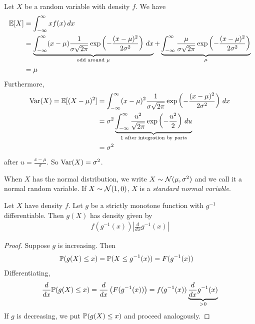 \documentclass{../template/note}
\begin{document}
    Let \(X\) be a random variable with density \(f\). We have
    \begin{align*}
        \mathbb E[X] &= \int_{-\infty}^\infty xf(x) \,d{x} \\
        &= \underbrace{\int_{-\infty}^\infty (x-\mu)\frac{1}{\sigma \sqrt{2\pi}} \exp\left(-\frac{(x-\mu)^2}{2\sigma^2}\right) \,d{x}}_{\text{odd around } \mu} + \underbrace{\int_{-\infty}^\infty \frac{\mu}{\sigma \sqrt{2\pi}} \exp\left(-\frac{(x-\mu)^2}{2\sigma^2}\right)}_{\mu} \\
        &= \mu
    \end{align*}
    Furthermore, 
    \begin{align*}
        \operatorname{Var}(X) = \mathbb E[(X-\mu)^2] &= \int_{-\infty}^\infty (x-\mu)^2 \frac 1{\sigma\sqrt{2\pi}} \exp\left(-\frac{(x-\mu)^2}{2\sigma^2}\right) \,d{x} \\
        &= \sigma^2 \underbrace{\int_{-\infty}^\infty \frac{u^2}{\sqrt{2\pi}} \exp\left(-\frac{u^2}2\right) \,d{u}}_{\text{1 after integration by parts}} \\
        &= \sigma^2
    \end{align*}
    after \(u = \frac{x-\mu}{\sigma}\). So \(\operatorname{Var}(X) = \sigma^2\).

    When \(X\) has the normal distribution, we write \(X \sim \mathcal{N}(\mu, \sigma^2)\) and we call it a normal random variable. If \(X \sim \mathcal{N}(1, 0)\), \(X\) is a \emph{standard normal variable}.

    \begin{proposition}
        Let \(X\) have density \(f\). Let \(g\) be a strictly monotone function with \(g^{-1}\) differentiable. Then \(g(X)\) has density given by
        \begin{align*}
            f(g^{-1}(x)) \left|\frac{d}{dx}g^{-1}(x)\right|
        \end{align*}
    \end{proposition}
    
    \begin{proof}
        Suppose \(g\) is increasing. Then
        \begin{align*}
            \mathbb P(g(X) \leq x) &= \mathbb P(X \leq g^{-1}(x)) = F(g^{-1}(x))
        \end{align*}
        Differentiating,
        \begin{align*}
            \frac{d}{dx} \mathbb P(g(X) \leq x) = \frac{d}{dx}\left(F(g^{-1}(x))\right) = f(g^{-1}(x)) \underbrace{\frac{d}{dx} g^{-1}(x)}_{>0}
        \end{align*}
        If \(g\) is decreasing, we put \(\mathbb P(g(X) \leq x)\) and proceed analogously.       
    \end{proof}
    
\end{document}
